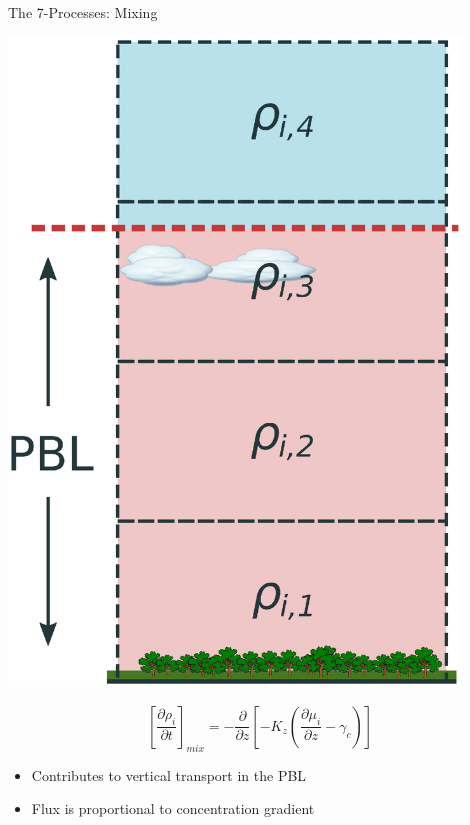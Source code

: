 \documentclass[10pt]{beamer}
\begin{document}
\begin{frame}[fragile]{The 7-Processes: Mixing}
    \begin{minipage}[c]{0.39\textwidth}
        \begin{center}
            \includegraphics[width=0.9\textwidth]{box-model-mixing.eps}
        \end{center}
        \footnotesize
        $$
            \left[ \frac{\partial \rho_i}{\partial t} \right]_{mix} = -\frac{\partial}{\partial z} \left[-K_z \left(\frac{\partial \mu_i}{\partial z} - \gamma_c \right)\right]
        $$
    \end{minipage} \hfill
    \begin{minipage}[c]{0.6\textwidth}
        \begin{itemize}
            \item Contributes to vertical transport in the PBL
            \item Flux is proportional to concentration gradient
        \end{itemize}

\end{minipage}
\end{frame}
\end{document}
